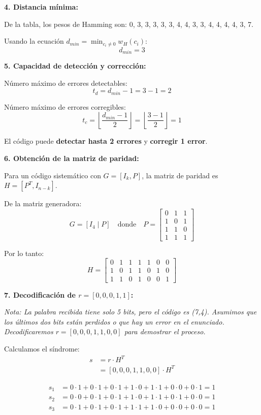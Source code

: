 \documentclass[10pt,a4paper]{article}
\begin{document}
\begin{solucion}
\textbf{4. Distancia mínima:}

De la tabla, los pesos de Hamming son: 0, 3, 3, 3, 3, 3, 4, 4, 3, 3, 4, 4, 4, 4, 3, 7.

Usando la ecuación $d_{min} = \min_{c_i \neq 0} w_H(c_i)$:
\[
d_{min} = 3
\]

\textbf{5. Capacidad de detección y corrección:}

Número máximo de errores detectables:
\[
t_d = d_{min} - 1 = 3 - 1 = 2
\]

Número máximo de errores corregibles:
\[
t_c = \left\lfloor \frac{d_{min} - 1}{2} \right\rfloor = \left\lfloor \frac{3-1}{2} \right\rfloor = 1
\]

El código puede \textbf{detectar hasta 2 errores} y \textbf{corregir 1 error}.

\textbf{6. Obtención de la matriz de paridad:}

Para un código sistemático con $G = [I_k, P]$, la matriz de paridad es $H = [P^T, I_{n-k}]$.

De la matriz generadora:
\[
G = \left[ I_4 \mid P \right] \quad \text{donde} \quad P = \begin{bmatrix}
0 & 1 & 1 \\
1 & 0 & 1 \\
1 & 1 & 0 \\
1 & 1 & 1
\end{bmatrix}
\]

Por lo tanto:
\[
H = \begin{bmatrix}
0 & 1 & 1 & 1 & 1 & 0 & 0 \\
1 & 0 & 1 & 1 & 0 & 1 & 0 \\
1 & 1 & 0 & 1 & 0 & 0 & 1
\end{bmatrix}
\]

\textbf{7. Decodificación de $r = [0,0,0,1,1]$:}

\textit{Nota: La palabra recibida tiene solo 5 bits, pero el código es (7,4). Asumimos que los últimos dos bits están perdidos o que hay un error en el enunciado. Decodificaremos $r = [0,0,0,1,1,0,0]$ para demostrar el proceso.}

Calculamos el síndrome:
\begin{align*}
s &= r \cdot H^T \\
&= [0,0,0,1,1,0,0] \cdot H^T
\end{align*}

\begin{align*}
s_1 &= 0 \cdot 1 + 0 \cdot 1 + 0 \cdot 1 + 1 \cdot 0 + 1 \cdot 1 + 0 \cdot 0 + 0 \cdot 1 = 1 \\
s_2 &= 0 \cdot 0 + 0 \cdot 1 + 0 \cdot 1 + 1 \cdot 0 + 1 \cdot 1 + 0 \cdot 1 + 0 \cdot 0 = 1 \\
s_3 &= 0 \cdot 1 + 0 \cdot 1 + 0 \cdot 1 + 1 \cdot 1 + 1 \cdot 0 + 0 \cdot 0 + 0 \cdot 0 = 1
\end{align*}


\end{solucion}
\end{document}
